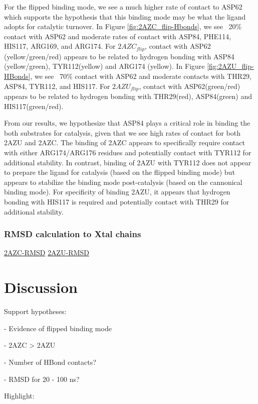 \documentclass[fleqn,10pt]{wlscirep}
\begin{document}
For the flipped binding mode, we see a much higher rate of contact to ASP62 which supports the hypothesis that this binding mode may be what the ligand adopts for catalytic turnover.
In Figure \ref{fig:2AZC_flip-Hbonds}, we see ~20\% contact with ASP62 and moderate rates of contact with ASP84, PHE114, HIS117, ARG169, and ARG174.
For $2AZC_{flip}$, contact with ASP62 (yellow/green/red) appears to be related to hydrogen bonding with ASP84 (yellow/green), TYR112(yellow) and ARG174 (yellow).
In Figure \ref{fig:2AZU_flip-HBonds}, we see ~70\% contact with ASP62 and moderate contacts with THR29, ASP84, TYR112, and HIS117.
For $2AZU_{flip}$, contact with ASP62(green/red) appears to be related to hydrogen bonding with THR29(red), ASP84(green) and HIS117(green/red).

From our results, we hypothesize that ASP84 plays a critical role in binding the both substrates for catalysis, given that we see high rates of contact for both 2AZU and 2AZC.
The binding of 2AZC appears to specifically require contact with either ARG174/ARG176 residues and potentially contact with TYR112 for additional stability.
In contrast, binding of 2AZU with TYR112 does not appear to prepare the ligand for catalysis (based on the flipped binding mode) but appears to stabilize the binding mode post-catalysis (based on the cannonical binding mode).
For specificity of binding 2AZU, it appears that hydrogen bonding with HIS117 is required and potentially contact with THR29 for additional stability.

\subsubsection{RMSD calculation to Xtal chains}


\href{https://github.com/nathanmlim/Spitale/blob/master/manual_md/notebooks/2AZC-pcca-rmsd.txt}{2AZC-RMSD}
\href{https://github.com/nathanmlim/Spitale/blob/master/manual_md/notebooks/2AZU-pcca-rmsd.txt}{2AZU-RMSD}


\section{Discussion}
Support hypotheses:

  - Evidence of flipped binding mode
  
  - 2AZC > 2AZU
  
     - Number of HBond contacts?
     
     - RMSD for 20 - 100 ns?

Highlight:
\end{document}
